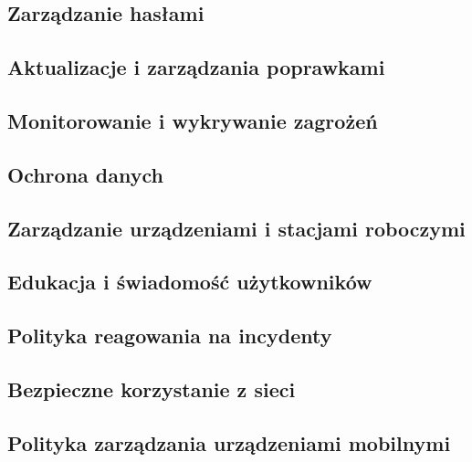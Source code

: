 \documentclass[12pt,a4paper]{article}
\begin{document}
\subsection{Zarządzanie hasłami}

\subsection{Aktualizacje i zarządzania poprawkami}

\subsection{Monitorowanie i wykrywanie zagrożeń}

\subsection{Ochrona danych}

\subsection{Zarządzanie urządzeniami i stacjami roboczymi}

\subsection{Edukacja i świadomość użytkowników}

\subsection{Polityka reagowania na incydenty}

\subsection{Bezpieczne korzystanie z sieci}

\subsection{Polityka zarządzania urządzeniami mobilnymi}




\end{document}
